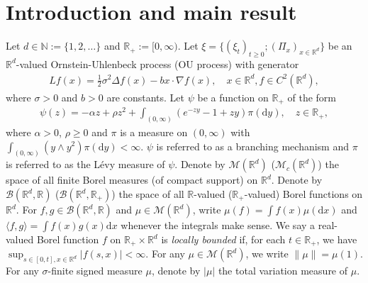 \documentclass[12pt,a4paper]{amsart}
\theoremstyle{plain}
\theoremstyle{definition}
\numberwithin{equation}{section}
\begin{document}
\section{Introduction and main result}
\label{subsec:M}
Let $d \in \mathbb N:= \{1,2,\dots\}$ and $\mathbb R_+:= [0,\infty)$.
Let $\xi=\{(\xi_t)_{t\geq 0}; (\Pi_x)_{x\in \mathbb R^d}\}$ be an $\mathbb R^d$-valued Ornstein-Uhlenbeck process (OU process) with generator
\begin{align}
  Lf(x)
  = \frac{1}{2}\sigma^2\Delta f(x)-b x \cdot \nabla f(x)
  , \quad  x\in \mathbb R^d, f \in C^2(\mathbb R^d),
\end{align}
where $\sigma > 0$ and $b > 0$ are constants.
Let $\psi$ be a function on $\mathbb R_+$ of the form
\begin{align}
  \psi(z)
  =- \alpha z + \rho z^2 + \int_{(0,\infty)} (e^{-zy} - 1 + zy) \pi(\mathrm dy)
  , \quad  z \in \mathbb R_+,
\end{align}
where $\alpha > 0 $, $\rho \geq0$ and $\pi$ is a measure on $(0,\infty)$ with $\int_{(0,\infty)}(y\wedge y^2)\pi(\mathrm dy)< \infty$.
$\psi$ is referred to as a branching mechanism and $\pi$ is referred to as the L\'evy measure of $\psi$.
Denote by $\mathcal M(\mathbb R^d)$ 
($\mathcal M_c(\mathbb R^d)$)
the space of all finite Borel measures (of compact support) on $\mathbb R^d$.
Denote by $\mathcal B(\mathbb R^d, \mathbb R)$ 
($\mathcal B(\mathbb R^d, \mathbb R_+)$)
the space of all $\mathbb R$-valued 
($\mathbb R_+$-valued)
Borel functions on $\mathbb R^d$.
For $f,g\in \mathcal B(\mathbb R^d, \mathbb R)$ and $\mu \in \mathcal M(\mathbb R^d)$,
 write $\mu(f)= \int f(x)\mu(\mathrm dx)$
and $\langle f, g\rangle = \int f(x)g(x) \mathrm dx$ whenever the integrals make sense.
We say a real-valued Borel function 
$f$
on $\mathbb R_+\times \mathbb R^d$ is \emph{locally bounded} if, for each $t\in \mathbb R_+$, we have $ \sup_{s\in [0,t],x\in \mathbb R^d} |f(s,x)|<\infty. $
For any $\mu \in \mathcal M(\mathbb R^d)$, we write $\|\mu\| = \mu(1)$.
For any $\sigma$-finite signed measure $\mu$, denote by $|\mu|$ the total variation measure of $\mu$.
\end{document}
